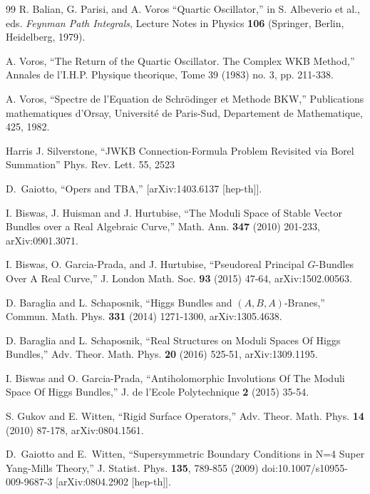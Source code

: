 \begin{thebibliography}{99}
R. Balian, G.  Parisi, and A.  Voros  
``Quartic Oscillator,''
in  S. Albeverio  et al., eds. {\it  Feynman Path Integrals}, Lecture Notes in Physics {\bf 106} (Springer, Berlin, Heidelberg, 1979). 

A. Voros, 
``The Return of the Quartic Oscillator. The Complex WKB Method,''
 Annales de l'I.H.P. Physique theorique, Tome 39 (1983) no. 3, pp. 211-338. 
 
A. Voros,
``Spectre de l'Equation de Schr\"{o}dinger et Methode BKW,''
Publications mathematiques d'Orsay,
Universit\'{e} de Paris-Sud, Departement de Mathematique, 425, 1982.

Harris J. Silverstone,
``JWKB Connection-Formula Problem Revisited via Borel Summation''
Phys. Rev. Lett. 55, 2523



D.~Gaiotto,
``Opers and TBA,''
[arXiv:1403.6137 [hep-th]].



I. Biswas, J. Huisman and J. Hurtubise,  ``The Moduli Space of Stable Vector Bundles over a Real Algebraic Curve,'' 
 Math. Ann. {\bf 347} (2010)  201-233, arXiv:0901.3071.


I. Biswas, O. Garcia-Prada, and J. Hurtubise, ``Pseudoreal Principal $G$-Bundles Over A Real Curve,''   J. London Math. Soc. {\bf 93} (2015) 47-64, arXiv:1502.00563.



D. Baraglia and L. Schaposnik, ``Higgs Bundles and $(A,B,A)$-Branes,'' 
Commun. Math. Phys. {\bf 331} (2014) 1271-1300, arXiv:1305.4638.

D. Baraglia and L. Schaposnik, ``Real Structures on Moduli Spaces Of Higgs Bundles,''  Adv. Theor. Math. Phys. 
{\bf 20} (2016) 525-51, arXiv:1309.1195.

 I. Biswas and O. Garcia-Prada, ``Antiholomorphic Involutions Of The Moduli Space Of Higgs Bundles,'' 
J. de l'Ecole Polytechnique {\bf 2} (2015) 35-54.

S. Gukov and E. Witten, ``Rigid Surface Operators,'' Adv. Theor. Math. Phys. {\bf 14} (2010) 87-178, arXiv:0804.1561.

D.~Gaiotto and E.~Witten,
``Supersymmetric Boundary Conditions in N=4 Super Yang-Mills Theory,''
J. Statist. Phys. \textbf{135}, 789-855 (2009)
doi:10.1007/s10955-009-9687-3
[arXiv:0804.2902 [hep-th]].



\end{thebibliography}
